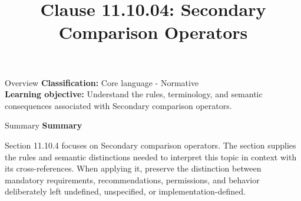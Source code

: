 \documentclass[10pt,letterpaper]{article}
\title{Clause 11.10.04: Secondary Comparison Operators}
\author{}
\date{}
\begin{document}
\maketitle
\begin{CornellOverviewBox}{Overview}
\textbf{Classification:} Core language - Normative\\[2pt]
\textbf{Learning objective:} Understand the rules, terminology, and semantic consequences associated with Secondary comparison operators.
\end{CornellOverviewBox}\begin{CornellSummaryBox}{Summary}
{\sffamily\bfseries\color{Accent} Summary}\par\vspace{3pt}Section 11.10.4 focuses on Secondary comparison operators. The section supplies the rules and semantic distinctions needed to interpret this topic in context with its cross-references. When applying it, preserve the distinction between mandatory requirements, recommendations, permissions, and behavior deliberately left undefined, unspecified, or implementation-defined.
\end{CornellSummaryBox}
\end{document}
